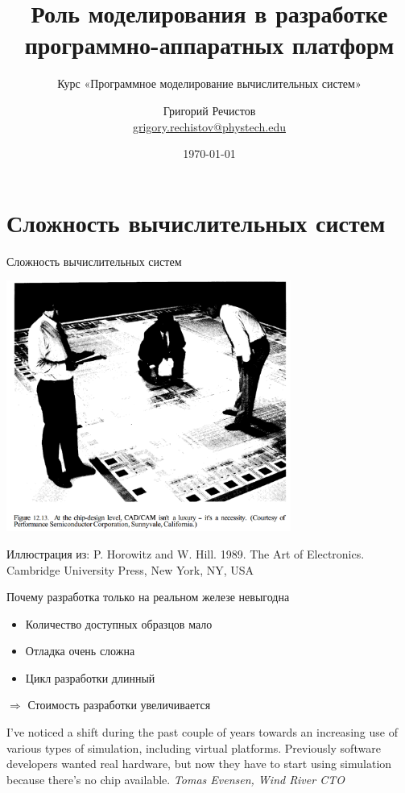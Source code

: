 \documentclass{beamer}
\title{Роль моделирования в разработке программно-аппаратных платформ}
\subtitle{Курс «Программное моделирование вычислительных систем»}
\author[]{Григорий Речистов \\ \small{\href{mailto:grigory.rechistov@phystech.edu}{grigory.rechistov@phystech.edu}}}
\date{\today}
\begin{document}
\begin{frame}
    \maketitle
\end{frame}

\begin{frame}
    \tableofcontents
\end{frame}

\section{Сложность вычислительных систем}

\begin{frame}{Сложность вычислительных систем}

\centering
\includegraphics[width=0.7\textwidth]{ic-floor}

\tiny{Иллюстрация из: P. Horowitz and W. Hill. 1989. The Art of Electronics. Cambridge University Press, New York, NY, USA}


\end{frame}

\begin{frame}{Почему разработка только на реальном железе невыгодна }

\begin{itemize}
\item Количество доступных образцов мало
\item Отладка очень сложна
\item Цикл разработки длинный
\end{itemize}

$\Rightarrow$ Стоимость разработки увеличивается

\bigskip

\tiny{I've noticed a shift during the past couple of years towards an increasing use of various types of simulation, including virtual platforms. Previously software developers wanted real hardware, but now they have to start using simulation because there's no chip available. \textit{Tomas Evensen, Wind River CTO}}

\end{frame}
\end{document}
